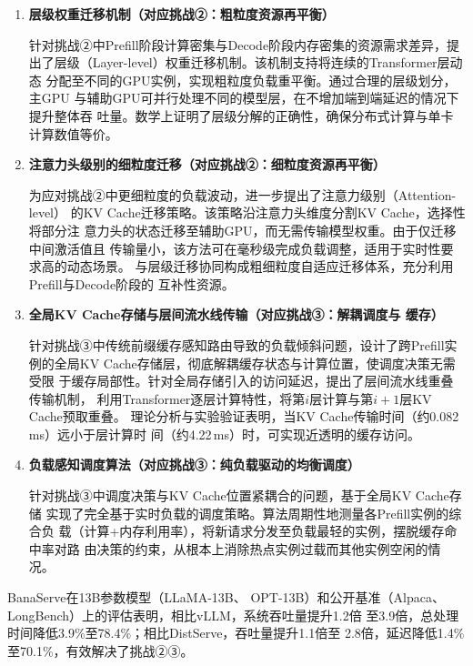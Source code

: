 \begin{enumerate}

\item \textbf{层级权重迁移机制（对应挑战②：粗粒度资源再平衡）}

针对挑战②中Prefill阶段计算密集与Decode阶段内存密集的资源需求差异，提
出了层级（Layer-level）权重迁移机制。该机制支持将连续的Transformer层动态
分配至不同的GPU实例，实现粗粒度负载重平衡。通过合理的层级划分，主GPU
与辅助GPU可并行处理不同的模型层，在不增加端到端延迟的情况下提升整体吞
吐量。数学上证明了层级分解的正确性，确保分布式计算与单卡计算数值等价。

\item \textbf{注意力头级别的细粒度迁移（对应挑战②：细粒度资源再平衡）}

为应对挑战②中更细粒度的负载波动，进一步提出了注意力级别（Attention-level）
的KV Cache迁移策略。该策略沿注意力头维度分割KV Cache，选择性将部分注
意力头的状态迁移至辅助GPU，而无需传输模型权重。由于仅迁移中间激活值且
传输量小，该方法可在毫秒级完成负载调整，适用于实时性要求高的动态场景。
与层级迁移协同构成粗细粒度自适应迁移体系，充分利用Prefill与Decode阶段的
互补性资源。

\item \textbf{全局KV Cache存储与层间流水线传输（对应挑战③：解耦调度与
缓存）}

针对挑战③中传统前缀缓存感知路由导致的负载倾斜问题，设计了跨Prefill实
例的全局KV Cache存储层，彻底解耦缓存状态与计算位置，使调度决策无需受限
于缓存局部性。针对全局存储引入的访问延迟，提出了层间流水线重叠传输机制，
利用Transformer逐层计算特性，将第$i$层计算与第$i+1$层KV Cache预取重叠。
理论分析与实验验证表明，当KV Cache传输时间（约0.082\,ms）远小于层计算时
间（约4.22\,ms）时，可实现近透明的缓存访问。

\item \textbf{负载感知调度算法（对应挑战③：纯负载驱动的均衡调度）}

针对挑战③中调度决策与KV Cache位置紧耦合的问题，基于全局KV Cache存储
实现了完全基于实时负载的调度策略。算法周期性地测量各Prefill实例的综合负
载（计算+内存利用率），将新请求分发至负载最轻的实例，摆脱缓存命中率对路
由决策的约束，从根本上消除热点实例过载而其他实例空闲的情况。

\end{enumerate}

BanaServe在13B参数模型（LLaMA-13B\cite{touvron2023llama}、
OPT-13B\cite{zhang2022opt}）和公开基准（Alpaca\cite{alpaca}、
LongBench\cite{bai2023longbench}）上的评估表明，相比vLLM，系统吞吐量提升1.2倍
至3.9倍，总处理时间降低3.9\%至78.4\%；相比DistServe，吞吐量提升1.1倍至
2.8倍，延迟降低1.4\%至70.1\%，有效解决了挑战②③。

